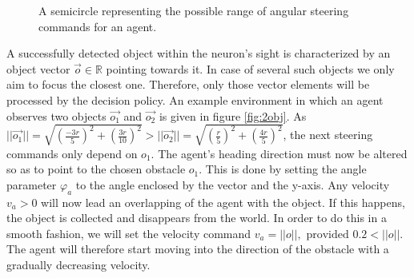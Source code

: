 \documentclass[10pt,a4paper,DIV=11]{scrreprt}
\begin{document}
\begin{center}
\begin{figure}
	\caption{A semicircle representing the possible range of angular steering commands for an agent.}
	\label{fig:acontrol}
\end{figure}
\end{center}

A successfully detected object within the neuron's sight is characterized by an object vector $\overrightarrow{o} \in \mathbb{R}$ pointing towards it. 
In case of several such objects we only aim to focus the closest one. Therefore, only those vector elements will be processed by the decision policy.
An example environment in which an agent observes two objects $\overrightarrow{o_1}$ and $\overrightarrow{o_2}$ is given in figure \ref{fig:2obj}. As
$||\overrightarrow{o_1}|| = \sqrt{(\frac{-3r}{5})^2 + (\frac{3r}{10})^2} > ||\overrightarrow{o_2}|| = \sqrt{(\frac{r}{5})^2 + (\frac{4r}{5})^2}$, the next steering commands only 
depend on $o_1$. The agent's heading direction must now be altered so as to point to the chosen obstacle $o_1$. This is done by setting the angle
parameter $\varphi_a$ to the angle enclosed by the vector and the y-axis. Any velocity $v_a > 0$ will now lead an overlapping of the agent with the
object. If this happens, the object is collected and disappears from the world. In order to do this in a smooth fashion, we will set the velocity
command $v_a = ||o||, \text{ provided } 0.2 < ||o||$. The agent will therefore start moving into the direction of the obstacle with a gradually decreasing velocity.
\end{document}
